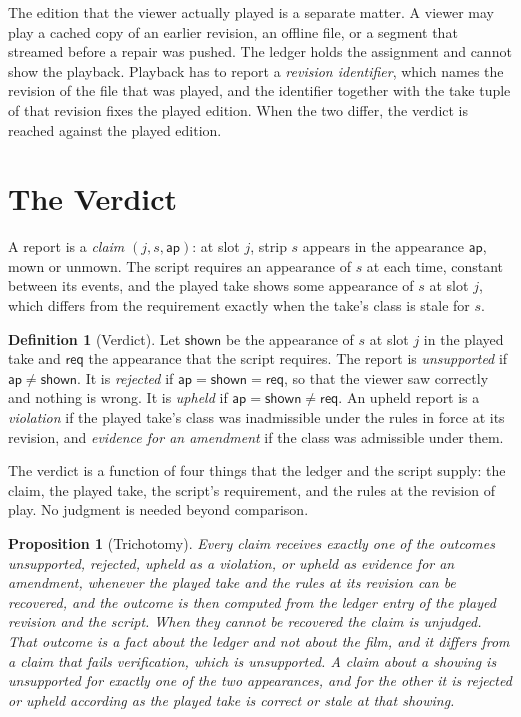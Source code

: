 \documentclass[11pt,twoside,openright]{book}
\theoremstyle{plain}
\newtheorem{proposition}[theorem]{Proposition}
\theoremstyle{definition}
\newtheorem{definition}[theorem]{Definition}
\theoremstyle{remark}
\begin{document}
The edition that the viewer actually played is a separate matter. A viewer may play a cached copy of an earlier revision, an offline file, or a segment that streamed before a repair was pushed. The ledger holds the assignment and cannot show the playback. Playback has to report a \emph{revision identifier}, which names the revision of the file that was played, and the identifier together with the take tuple of that revision fixes the played edition. When the two differ, the verdict is reached against the played edition.

\section{The Verdict}\label{sec:verdict}

A report is a \emph{claim} $(j,s,\mathsf{ap})$: at slot $j$, strip $s$ appears in the appearance $\mathsf{ap}$, mown or unmown. The script requires an appearance of $s$ at each time, constant between its events, and the played take shows some appearance of $s$ at slot $j$, which differs from the requirement exactly when the take's class is stale for $s$.

\begin{definition}[Verdict]\label{def:verdict7}
Let $\mathsf{shown}$ be the appearance of $s$ at slot $j$ in the played take and $\mathsf{req}$ the appearance that the script requires. The report is \emph{unsupported} if $\mathsf{ap}\neq\mathsf{shown}$. It is \emph{rejected} if $\mathsf{ap}=\mathsf{shown}=\mathsf{req}$, so that the viewer saw correctly and nothing is wrong. It is \emph{upheld} if $\mathsf{ap}=\mathsf{shown}\neq\mathsf{req}$. An upheld report is a \emph{violation} if the played take's class was inadmissible under the rules in force at its revision, and \emph{evidence for an amendment} if the class was admissible under them.
\end{definition}

The verdict is a function of four things that the ledger and the script supply: the claim, the played take, the script's requirement, and the rules at the revision of play. No judgment is needed beyond comparison.

\begin{proposition}[Trichotomy]\label{prop:trichotomy}
Every claim receives exactly one of the outcomes unsupported, rejected, upheld as a violation, or upheld as evidence for an amendment, whenever the played take and the rules at its revision can be recovered, and the outcome is then computed from the ledger entry of the played revision and the script. When they cannot be recovered the claim is \emph{unjudged}. That outcome is a fact about the ledger and not about the film, and it differs from a claim that fails verification, which is unsupported. A claim about a showing is unsupported for exactly one of the two appearances, and for the other it is rejected or upheld according as the played take is correct or stale at that showing.
\end{proposition}
\end{document}
